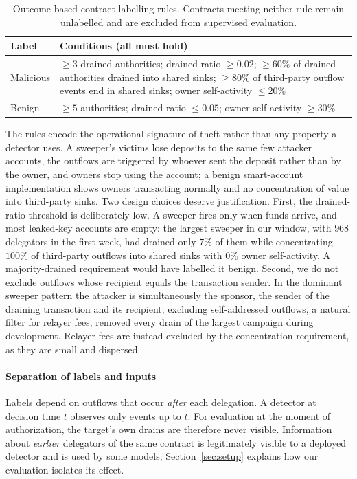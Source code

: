 \begin{table}[t]
\centering
\caption{Outcome-based contract labelling rules. Contracts meeting neither rule remain unlabelled and are excluded from supervised evaluation.}
\label{tab:labels}
\footnotesize
\setlength{\tabcolsep}{4pt}
\begin{tabular}{p{}p{}}
\toprule
Label & Conditions (all must hold) \\
\midrule
Malicious & $\ge 3$ drained authorities; drained ratio $\ge 0.02$; $\ge 60\%$ of drained authorities drained into shared sinks; $\ge 80\%$ of third-party outflow events end in shared sinks; owner self-activity $\le 20\%$ \\
Benign & $\ge 5$ authorities; drained ratio $\le 0.05$; owner self-activity $\ge 30\%$ \\
\bottomrule
\end{tabular}
\end{table}

The rules encode the operational signature of theft rather than any property a detector uses. A sweeper's victims lose deposits to the same few attacker accounts, the outflows are triggered by whoever sent the deposit rather than by the owner, and owners stop using the account; a benign smart-account implementation shows owners transacting normally and no concentration of value into third-party sinks. Two design choices deserve justification. First, the drained-ratio threshold is deliberately low. A sweeper fires only when funds arrive, and most leaked-key accounts are empty: the largest sweeper in our window, with $968$ delegators in the first week, had drained only $7\%$ of them while concentrating $100\%$ of third-party outflows into shared sinks with $0\%$ owner self-activity. A majority-drained requirement would have labelled it benign. Second, we do not exclude outflows whose recipient equals the transaction sender. In the dominant sweeper pattern the attacker is simultaneously the sponsor, the sender of the draining transaction and its recipient; excluding self-addressed outflows, a natural filter for relayer fees, removed every drain of the largest campaign during development. Relayer fees are instead excluded by the concentration requirement, as they are small and dispersed.

\paragraph{Separation of labels and inputs} Labels depend on outflows that occur \emph{after} each delegation. A detector at decision time $t$ observes only events up to $t$. For evaluation at the moment of authorization, the target's own drains are therefore never visible. Information about \emph{earlier} delegators of the same contract is legitimately visible to a deployed detector and is used by some models; Section~\ref{sec:setup} explains how our evaluation isolates its effect.

